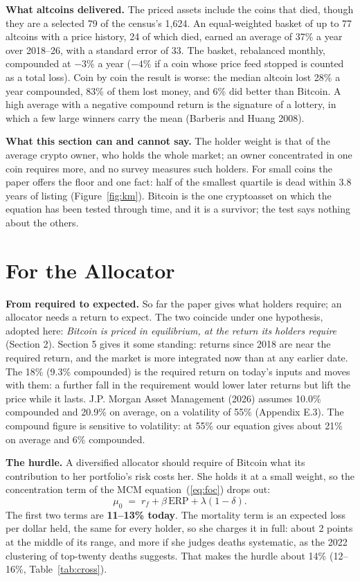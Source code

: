 \documentclass[11pt]{article}
\begin{document}
\begin{table}[ht]
\end{table}

\textbf{What altcoins delivered.} The priced assets include the coins that died, though they are a selected 79 of the census's 1,624. An equal-weighted basket of up to 77 altcoins with a price history, 24 of which died, earned an average of 37\% a year over 2018--26, with a standard error of 33. The basket, rebalanced monthly, compounded at $-3\%$ a year ($-4\%$ if a coin whose price feed stopped is counted as a total loss). Coin by coin the result is worse: the median altcoin lost 28\% a year compounded, 83\% of them lost money, and 6\% did better than Bitcoin. A high average with a negative compound return is the signature of a lottery, in which a few large winners carry the mean (Barberis and Huang 2008).

\textbf{What this section can and cannot say.} The holder weight is that of the average crypto owner, who holds the whole market; an owner concentrated in one coin requires more, and no survey measures such holders. For small coins the paper offers the floor and one fact: half of the smallest quartile is dead within 3.8 years of listing (Figure~\ref{fig:km}). Bitcoin is the one cryptoasset on which the equation has been tested through time, and it is a survivor; the test says nothing about the others.

\section{For the Allocator}

\textbf{From required to expected.} So far the paper gives what holders require; an allocator needs a return to expect. The two coincide under one hypothesis, adopted here: \emph{Bitcoin is priced in equilibrium, at the return its holders require} (Section 2). Section 5 gives it some standing: returns since 2018 are near the required return, and the market is more integrated now than at any earlier date. The 18\% (9.3\% compounded) is the required return on today's inputs and moves with them: a further fall in the requirement would lower later returns but lift the price while it lasts. J.P. Morgan Asset Management (2026) assumes 10.0\% compounded and 20.9\% on average, on a volatility of 55\% (Appendix E.3). The compound figure is sensitive to volatility: at 55\% our equation gives about 21\% on average and 6\% compounded.

\textbf{The hurdle.} A diversified allocator should require of Bitcoin what its contribution to her portfolio's risk costs her. She holds it at a small weight, so the concentration term of the MCM equation~(\ref{eq:foc}) drops out:
\begin{equation}
\mu_0 \;=\; r_f + \beta\,\mathrm{ERP} + \lambda(1-\delta).
\label{eq:hurdle}
\end{equation}
The first two terms are \textbf{11--13\% today}. The mortality term is an expected loss per dollar held, the same for every holder, so she charges it in full: about 2 points at the middle of its range, and more if she judges deaths systematic, as the 2022 clustering of top-twenty deaths suggests. That makes the hurdle about 14\% (12--16\%, Table~\ref{tab:cross}).
\end{document}
